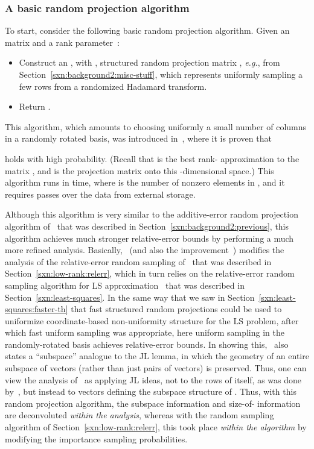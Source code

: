 \documentclass[twoside]{article}
\begin{document}
\subsubsection{A basic random projection algorithm}
\label{sxn:low-rank:proj-first}

To start, consider the following basic random projection algorithm.
Given an  matrix  and a rank parameter~:
\begin{itemize}
\item
Construct an , with , structured random 
projection matrix , \emph{e.g.},  from 
Section~\ref{sxn:background2:misc-stuff}, which represents uniformly 
sampling a few rows from a randomized Hadamard transform.
\item
Return .
\end{itemize}
This algorithm, which amounts to choosing uniformly a small number  
of columns in a randomly rotated basis, was introduced in~\cite{Sarlos06},
where it is proven that

holds with high probability.
(Recall that  is the best rank- approximation to the matrix , and 
 is the projection matrix onto this -dimensional space.)
This algorithm runs in  time, where 
is the number of nonzero elements in , and it requires  passes over the
data from external storage.


Although this algorithm is very similar to the additive-error random 
projection algorithm of~\cite{PRTV00} that was described in 
Section~\ref{sxn:background2:previous}, this algorithm achieves much 
stronger relative-error bounds by performing a much more refined analysis.
Basically,~\cite{Sarlos06} (and also the improvement~\cite{NDT09}) modifies 
the analysis of the relative-error random sampling 
of~\cite{DMM08_CURtheory_JRNL,CUR_PNAS} that was described in 
Section~\ref{sxn:low-rank:relerr}, which in turn relies on the 
relative-error random sampling algorithm for LS 
approximation~\cite{DMM06,DMM08_CURtheory_JRNL} that was described in 
Section~\ref{sxn:least-squares}.
In the same way that we saw in Section~\ref{sxn:least-squares:faster-th} that
fast structured random projections could be used to uniformize 
coordinate-based non-uniformity structure for the LS problem, after which 
fast uniform sampling was appropriate, here uniform sampling in the 
randomly-rotated basis achieves relative-error bounds.
In showing this,~\cite{Sarlos06} also states a ``subspace'' analogue to the 
JL lemma, in which the geometry of an entire subspace of vectors (rather 
than just  pairs of vectors) is preserved.
Thus, one can view the analysis of~\cite{Sarlos06} as applying JL ideas, 
not to the rows of  itself, as was done by~\cite{PRTV00}, but instead
to vectors defining the subspace structure of .
Thus, with this random projection algorithm, the subspace information and 
size-of- information are deconvoluted \emph{within the analysis}, whereas 
with the random sampling algorithm of Section~\ref{sxn:low-rank:relerr}, 
this took place \emph{within the algorithm} by modifying the importance 
sampling probabilities.
\end{document}
